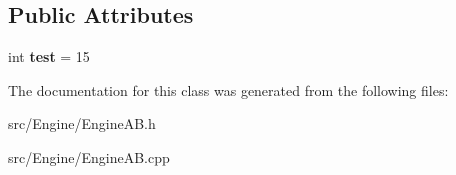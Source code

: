 \subsection*{Public Attributes}
\begin{DoxyCompactItemize}
\item 
\mbox{\label{classEngineAB_afdace37e8f48b1d23009babb79e1434e}} 
int {\bfseries test} = 15
\end{DoxyCompactItemize}


The documentation for this class was generated from the following files\+:\begin{DoxyCompactItemize}
\item 
src/\+Engine/Engine\+A\+B.\+h\item 
src/\+Engine/Engine\+A\+B.\+cpp\end{DoxyCompactItemize}
